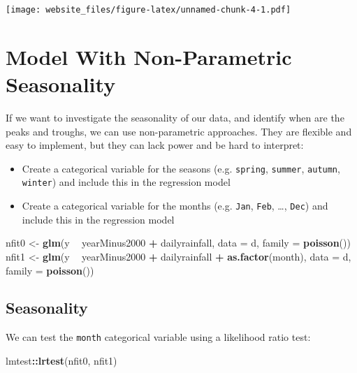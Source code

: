 \documentclass[]{book}
\newenvironment{Shaded}{\begin{snugshade}}{\end{snugshade}}
\newcommand{\KeywordTok}[1]{\textcolor[rgb]{0.13,0.29,0.53}{\textbf{#1}}}
\newcommand{\DataTypeTok}[1]{\textcolor[rgb]{0.13,0.29,0.53}{#1}}
\newcommand{\StringTok}[1]{\textcolor[rgb]{0.31,0.60,0.02}{#1}}
\newcommand{\OperatorTok}[1]{\textcolor[rgb]{0.81,0.36,0.00}{\textbf{#1}}}
\newcommand{\NormalTok}[1]{#1}
\providecommand{\tightlist}{%
  \setlength{\itemsep}{0pt}\setlength{\parskip}{0pt}}
\begin{document}
\texttt{[image: website\_files/figure-latex/unnamed-chunk-4-1.pdf]}

\section{Model With Non-Parametric
Seasonality}\label{model-with-non-parametric-seasonality}

If we want to investigate the seasonality of our data, and identify when
are the peaks and troughs, we can use non-parametric approaches. They
are flexible and easy to implement, but they can lack power and be hard
to interpret:

\begin{itemize}
\tightlist
\item
  Create a categorical variable for the seasons (e.g. \texttt{spring},
  \texttt{summer}, \texttt{autumn}, \texttt{winter}) and include this in
  the regression model
\item
  Create a categorical variable for the months (e.g. \texttt{Jan},
  \texttt{Feb}, \ldots{}, \texttt{Dec}) and include this in the
  regression model
\end{itemize}

\begin{Shaded}
\begin{Highlighting}[]
\NormalTok{nfit0 <-}\StringTok{ }\KeywordTok{glm}\NormalTok{(y }\OperatorTok{~}\StringTok{ }\NormalTok{yearMinus2000 }\OperatorTok{+}\StringTok{ }\NormalTok{dailyrainfall, }\DataTypeTok{data =}\NormalTok{ d, }\DataTypeTok{family =} \KeywordTok{poisson}\NormalTok{())}
\NormalTok{nfit1 <-}\StringTok{ }\KeywordTok{glm}\NormalTok{(y }\OperatorTok{~}\StringTok{ }\NormalTok{yearMinus2000 }\OperatorTok{+}\StringTok{ }\NormalTok{dailyrainfall }\OperatorTok{+}\StringTok{ }\KeywordTok{as.factor}\NormalTok{(month), }\DataTypeTok{data =}\NormalTok{ d, }\DataTypeTok{family =} \KeywordTok{poisson}\NormalTok{())}
\end{Highlighting}
\end{Shaded}

\subsection{Seasonality}\label{seasonality}

We can test the \texttt{month} categorical variable using a likelihood
ratio test:

\begin{Shaded}
\begin{Highlighting}[]
\NormalTok{lmtest}\OperatorTok{::}\KeywordTok{lrtest}\NormalTok{(nfit0, nfit1)}
\end{Highlighting}
\end{Shaded}
\end{document}
